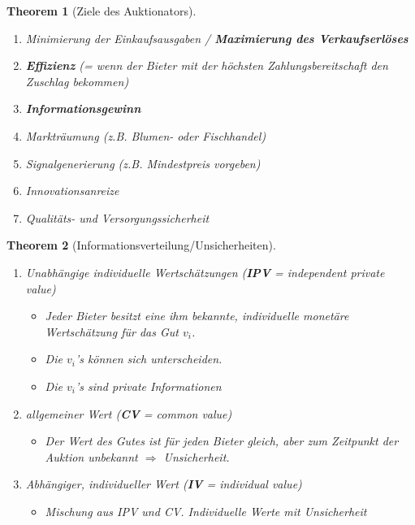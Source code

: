 \documentclass[12pt]{extreport} %
\theoremstyle{named}
\theoremstyle{nnamed}
\newtheorem*{unnamedtheorem*}{Theorem}
\theoremstyle{itshape}
\theoremstyle{normal}
\begin{document}
 
\begin{unnamedtheorem*}[Ziele des Auktionators] ~\
	\begin{enumerate}
		\item Minimierung der Einkaufsausgaben / \textbf{Maximierung des Verkaufserlöses}
		\item \textbf{Effizienz} (= wenn der Bieter mit der höchsten Zahlungsbereitschaft den Zuschlag bekommen)
		\item \textbf{Informationsgewinn}
		\item Markträumung (z.B. Blumen- oder Fischhandel)
		\item Signalgenerierung (z.B. Mindestpreis vorgeben)
		\item Innovationsanreize
		\item Qualitäts- und Versorgungssicherheit
	\end{enumerate}	
\end{unnamedtheorem*}

  
\begin{unnamedtheorem*}[Informationsverteilung/Unsicherheiten] ~\
	\begin{enumerate}
		\item Unabhängige individuelle Wertschätzungen (\textbf{IPV} = independent private value)
			\begin{itemize}
				\item Jeder Bieter besitzt eine ihm bekannte, individuelle monetäre Wertschätzung für das Gut $v_{i}$.
				\item Die $v_{i}$'s können sich unterscheiden.
				\item Die $v_{i}$'s sind private Informationen
			\end{itemize}
		\item allgemeiner Wert (\textbf{CV} = common value)
			\begin{itemize}
				\item Der Wert des Gutes ist für jeden Bieter gleich, aber zum Zeitpunkt der Auktion unbekannt $\Rightarrow$ Unsicherheit.
			\end{itemize}
		\item Abhängiger, individueller Wert (\textbf{IV} = individual value)
			\begin{itemize}
				\item Mischung aus IPV und CV. Individuelle Werte mit Unsicherheit
			\end{itemize}
	\end{enumerate}	
\end{unnamedtheorem*}
\end{document}
